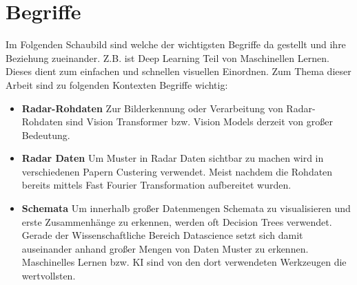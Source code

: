 \section{Begriffe}
Im Folgenden Schaubild sind welche der wichtigsten Begriffe da gestellt und ihre Beziehung zueinander. 
Z.B. ist Deep Learning Teil von Maschinellen Lernen. Dieses dient zum einfachen und schnellen visuellen Einordnen. 
Zum Thema dieser Arbeit sind zu folgenden Kontexten Begriffe wichtig:
\smallskip
\begin{itemize}
    \item \textbf{Radar-Rohdaten}
        Zur Bilderkennung oder Verarbeitung von Radar-Rohdaten sind Vision Transformer bzw. Vision Models 
        derzeit von großer Bedeutung.

    \item \textbf{Radar Daten}
        Um Muster in Radar Daten sichtbar zu machen wird in verschiedenen Papern Custering verwendet. 
        Meist nachdem die Rohdaten bereits mittels Fast Fourier Transformation aufbereitet wurden.
        
    \item \textbf{Schemata}
        Um innerhalb großer Datenmengen Schemata zu visualisieren und erste Zusammenhänge zu erkennen, 
        werden oft Decision Trees verwendet. Gerade der Wissenschaftliche Bereich Datascience setzt sich 
        damit auseinander anhand großer Mengen von Daten Muster zu erkennen. Maschinelles Lernen 
        bzw. KI sind von den dort verwendeten Werkzeugen die wertvollsten. 

\end{itemize}

